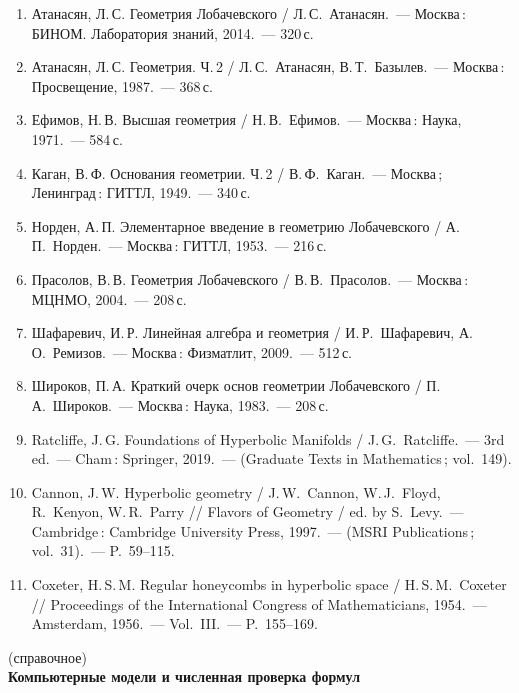 \begin{enumerate}[label=\arabic*.,leftmargin=*,labelindent=\parindent,itemsep=0pt]
  \item Атанасян, Л.\,С. Геометрия Лобачевского / Л.\,С.~Атанасян.~--- Москва\,: БИНОМ. Лаборатория знаний, 2014.~--- 320\,с.
  \item Атанасян, Л.\,С. Геометрия. Ч.\,2 / Л.\,С.~Атанасян, В.\,Т.~Базылев.~--- Москва\,: Просвещение, 1987.~--- 368\,с.
  \item Ефимов, Н.\,В. Высшая геометрия / Н.\,В.~Ефимов.~--- Москва\,: Наука, 1971.~--- 584\,с.
  \item Каган, В.\,Ф. Основания геометрии. Ч.\,2 / В.\,Ф.~Каган.~--- Москва\,; Ленинград\,: ГИТТЛ, 1949.~--- 340\,с.
  \item Норден, А.\,П. Элементарное введение в геометрию Лобачевского / А.\,П.~Норден.~--- Москва\,: ГИТТЛ, 1953.~--- 216\,с.
  \item Прасолов, В.\,В. Геометрия Лобачевского / В.\,В.~Прасолов.~--- Москва\,: МЦНМО, 2004.~--- 208\,с.
  \item Шафаревич, И.\,Р. Линейная алгебра и геометрия / И.\,Р.~Шафаревич, А.\,О.~Ремизов.~--- Москва\,: Физматлит, 2009.~--- 512\,с.
  \item Широков, П.\,А. Краткий очерк основ геометрии Лобачевского / П.\,А.~Широков.~--- Москва\,: Наука, 1983.~--- 208\,с.
  \item Ratcliffe, J.\,G. Foundations of Hyperbolic Manifolds / J.\,G.~Ratcliffe.~--- 3rd ed.~--- Cham\,: Springer, 2019.~--- (Graduate Texts in Mathematics\,; vol.~149). 
  \item Cannon, J.\,W. Hyperbolic geometry / J.\,W.~Cannon, W.\,J.~Floyd, R.~Kenyon, W.\,R.~Parry // Flavors of Geometry / ed. by S.~Levy.~--- Cambridge\,: Cambridge University Press, 1997.~--- (MSRI Publications\,; vol.~31).~--- P.~59--115. 
  \item Coxeter, H.\,S.\,M. Regular honeycombs in hyperbolic space / H.\,S.\,M.~Coxeter // Proceedings of the International Congress of Mathematicians, 1954.~--- Amsterdam, 1956.~--- Vol.~III.~--- P.~155--169. 
\end{enumerate}

\begin{center}
(справочное)\\
\textbf{Компьютерные модели и численная проверка формул}
\end{center}

